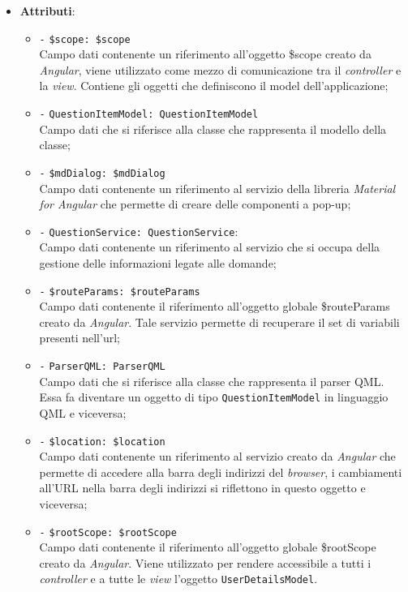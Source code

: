 \begin{itemize}
\begin{itemize}
	\end{itemize}
	\item \textbf{Attributi}:
	\begin{itemize}
		\item \texttt{-} \texttt{\$scope: \$scope} \\
		Campo dati contenente un riferimento all'oggetto \$scope creato da \textit{Angular}, viene utilizzato come mezzo di comunicazione tra il \textit{controller} e la \textit{view}. Contiene gli oggetti che definiscono il model dell'applicazione;
		\item \texttt{-} \texttt{QuestionItemModel: QuestionItemModel} \\
		Campo dati che si riferisce alla classe che rappresenta il modello della classe;
		\item \texttt{-} \texttt{\$mdDialog: \$mdDialog} \\
		Campo dati contenente un riferimento al servizio della libreria \textit{Material for Angular} che permette di creare delle componenti a pop-up;
		\item \texttt{-} \texttt{QuestionService: QuestionService}: \\
		Campo dati contenente un riferimento al servizio che si occupa della gestione delle informazioni legate alle domande; 
		\item \texttt{-} \texttt{\$routeParams: \$routeParams} \\
		Campo dati contenente il riferimento all'oggetto globale \$routeParams creato da \textit{Angular}. Tale servizio permette di recuperare il set di variabili presenti nell'url; 
		\item \texttt{-} \texttt{ParserQML: ParserQML} \\
		Campo dati che si riferisce alla classe che rappresenta il parser QML. Essa fa diventare un oggetto di tipo \texttt{QuestionItemModel} in linguaggio QML e viceversa;
		\item \texttt{-} \texttt{\$location: \$location} \\
		Campo dati contenente un riferimento al servizio creato da \textit{Angular} che permette di accedere alla barra degli indirizzi del \textit{browser}, i cambiamenti all'URL nella barra degli indirizzi si riflettono in questo oggetto e viceversa; 
		\item \texttt{-} \texttt{\$rootScope: \$rootScope} \\
		Campo dati contenente il riferimento all'oggetto globale \$rootScope creato da \textit{Angular}. Viene utilizzato per rendere accessibile a tutti i \textit{controller} e a tutte le \textit{view} l'oggetto \texttt{UserDetailsModel}.

\end{itemize}
\end{itemize}
